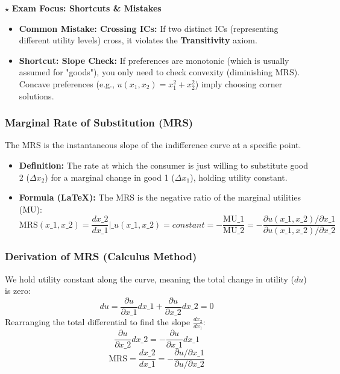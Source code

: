 \documentclass{article}
\begin{document}
$\star$ \textbf{Exam Focus: Shortcuts \& Mistakes}

\begin{itemize}
    \item \textbf{Common Mistake: Crossing ICs:} If two distinct ICs (representing different utility levels) cross, it violates the \textbf{Transitivity} axiom.

    \item \textbf{Shortcut: Slope Check:} If preferences are monotonic (which is usually assumed for "goods"), you only need to check convexity (diminishing MRS). Concave preferences (e.g., $u(x_1, x_2) = x_1^2 + x_2^2$) imply choosing corner solutions.
\end{itemize}

\subsubsection*{Marginal Rate of Substitution (MRS)}

The MRS is the instantaneous slope of the indifference curve at a specific point.

\begin{itemize}
    \item \textbf{Definition:} The rate at which the consumer is just willing to substitute good 2 ($\Delta x_2$) for a marginal change in good 1 ($\Delta x_1$), holding utility constant.

    \item \textbf{Formula (LaTeX):} The MRS is the negative ratio of the marginal utilities (MU): \[\text{MRS}(x\_1, x\_2) = \frac{dx\_2}{dx\_1} \bigg\rvert\_{u(x\_1, x\_2)=constant} = -\frac{\text{MU}\_1}{\text{MU}\_2} = -\frac{\partial u(x\_1, x\_2)/\partial x\_1}{\partial u(x\_1, x\_2)/\partial x\_2}\]
\end{itemize}

\subsubsection*{Derivation of MRS (Calculus Method)}

We hold utility constant along the curve, meaning the total change in utility ($du$) is zero: \[du = \frac{\partial u}{\partial x\_1} dx\_1 + \frac{\partial u}{\partial x\_2} dx\_2 = 0\] Rearranging the total differential to find the slope $\frac{dx_2}{dx_1}$: \[\frac{\partial u}{\partial x\_2} dx\_2 = -\frac{\partial u}{\partial x\_1} dx\_1\] \[\text{MRS} = \frac{dx\_2}{dx\_1} = -\frac{\partial u/\partial x\_1}{\partial u/\partial x\_2}\]
\end{document}
